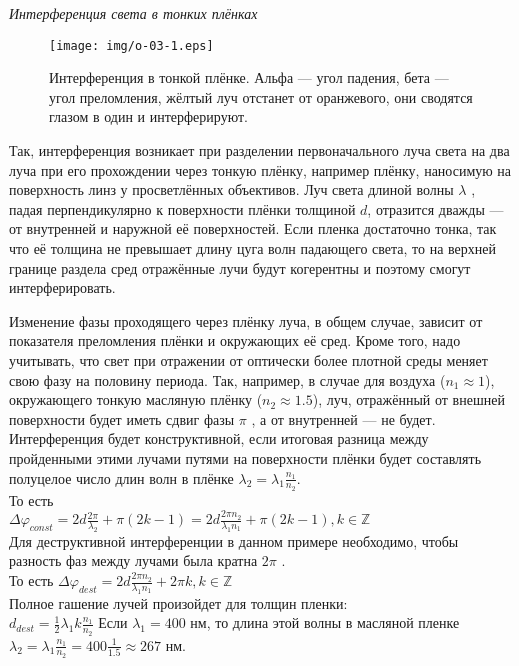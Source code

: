 \textit{Интерференция света в тонких плёнках}\\
\begin{figure}[h]
	\texttt{[image: img/o-03-1.eps]}
	\caption{Интерференция в тонкой плёнке. Альфа — угол падения, бета — угол преломления, жёлтый луч отстанет от оранжевого, они сводятся глазом в один и интерферируют.}
\end{figure}
Так, интерференция возникает при разделении первоначального луча света на два луча при его прохождении через тонкую плёнку, например плёнку, наносимую на поверхность линз у просветлённых объективов. Луч света длиной волны $\lambda$ , падая перпендикулярно к поверхности плёнки толщиной $d$, отразится дважды — от внутренней и наружной её поверхностей. Если пленка достаточно тонка, так что её толщина не превышает длину цуга волн падающего света, то на верхней границе раздела сред отражённые лучи будут когерентны и поэтому смогут интерферировать.

Изменение фазы проходящего через плёнку луча, в общем случае, зависит от показателя преломления плёнки и окружающих её сред. Кроме того, надо учитывать, что свет при отражении от оптически более плотной среды меняет свою фазу на половину периода. Так, например, в случае для воздуха ($n_1 ≈ 1$), окружающего тонкую масляную плёнку ($n_2 ≈ 1.5$), луч, отражённый от внешней поверхности будет иметь сдвиг фазы $\pi$ , а от внутренней — не будет. Интерференция будет конструктивной, если итоговая разница между пройденными этими лучами путями на поверхности плёнки будет составлять полуцелое число длин волн в плёнке $\lambda_2 = \lambda_1\frac{n_1}{n_2}$.\\
То есть\\
${\displaystyle \Delta \varphi _{const}=2d{\frac {2\pi }{\lambda _{2}}}+\pi (2k-1)=2d{\frac {2\pi n_{2}}{\lambda _{1}n_{1}}}+\pi (2k-1),k\in \mathbb {Z} }$\\ 
Для деструктивной интерференции в данном примере необходимо, чтобы разность фаз между лучами была кратна $2\pi$ .\\
То есть ${\displaystyle \Delta \varphi _{dest}=2d{\frac {2\pi n_{2}}{\lambda _{1}n_{1}}}+2\pi k,k\in \mathbb {Z} }$ \\
Полное гашение лучей произойдет для толщин пленки:\\
 ${\displaystyle d_{dest}={\frac {1}{2}}\lambda _{1}k{\frac {n_{1}}{n_{2}}}}$ 
Если ${\displaystyle \lambda _{1}=400}$ нм, то длина этой волны в масляной пленке ${\displaystyle \lambda _{2}=\lambda _{1}{\frac {n_{1}}{n_{2}}}=400{\frac {1}{1.5}}\approx 267}$ нм.

